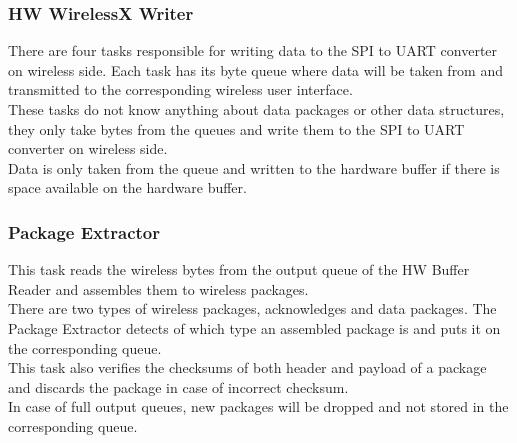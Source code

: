 \subsubsection{HW WirelessX Writer}
There are four tasks responsible for writing data to the SPI to UART converter on wireless side. Each task has its byte queue where data will be taken from and transmitted to the corresponding wireless user interface. \\
These tasks do not know anything about data packages or other data structures, they only take bytes from the queues and write them to the SPI to UART converter on wireless side. \\
Data is only taken from the queue and written to the hardware buffer if there is space available on the hardware buffer.\\
\subsubsection{Package Extractor}
This task reads the wireless bytes from the output queue of the HW Buffer Reader and assembles them to wireless packages.\\
There are two types of wireless packages, acknowledges and data packages. The Package Extractor detects of which type an assembled package is and puts it on the corresponding queue.\\
This task also verifies the checksums of both header and payload of a package and discards the package in case of incorrect checksum. \\
In case of full output queues, new packages will be dropped and not stored in the corresponding queue.\\
